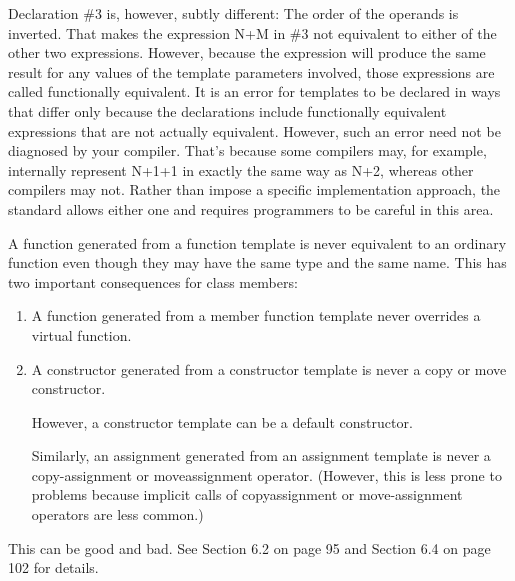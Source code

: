 Declaration \#3 is, however, subtly different: The order of the operands is inverted. That makes the expression N+M in \#3 not equivalent to either of the other two expressions. However, because the expression will produce the same result for any values of the template parameters involved, those expressions are called functionally equivalent. It is an error for templates to be declared in ways that differ only because the declarations include functionally equivalent expressions that are not actually equivalent. However, such an error need not be diagnosed by your compiler. That’s because some compilers may, for example, internally represent N+1+1 in exactly the same way as N+2, whereas other compilers may not. Rather than impose a specific implementation approach, the standard allows either one and requires programmers to be careful in this area.

A function generated from a function template is never equivalent to an ordinary function even though they may have the same type and the same name. This has two important consequences for class members:

\begin{enumerate}
\item
A function generated from a member function template never overrides a virtual function.

\item
A constructor generated from a constructor template is never a copy or move constructor.

\begin{tcolorbox}[colback=webgreen!5!white,colframe=webgreen!75!black]
\hspace*{0.75cm}However, a constructor template can be a default constructor.
\end{tcolorbox}

Similarly, an assignment generated from an assignment template is never a copy-assignment or moveassignment operator. (However, this is less prone to problems because implicit calls of copyassignment or move-assignment operators are less common.)
\end{enumerate}

This can be good and bad. See Section 6.2 on page 95 and Section 6.4 on page 102 for details.











